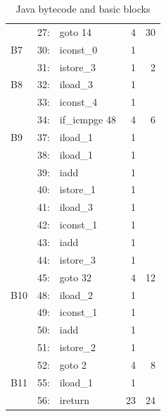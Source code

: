\begin{table}
\begin{center}
\begin{tiny}
\begin{tabular}{lllrr}
    & 27: &    goto 14           &          4         &              30 \\
    \cmidrule{1-5}
B7  & 30: &    iconst\_0         &           1        &           \\
    & 31: &    istore\_3         &           1        &                2 \\
    \cmidrule{1-5}
B8  & 32: &    iload\_3          &           1        &           \\
    & 33: &    iconst\_4         &           1        &           \\
    & 34: &    if\_icmpge 48     &           4        &                6 \\
    \cmidrule{1-5}
B9  & 37: &    iload\_1          &           1        &           \\
    & 38: &    iload\_1          &           1        &           \\
    & 39: &    iadd              &          1         &          \\
    & 40: &    istore\_1         &           1        &           \\
    & 41: &    iload\_3          &           1        &           \\
    & 42: &    iconst\_1         &           1        &           \\
    & 43: &    iadd              &          1         &          \\
    & 44: &    istore\_3         &           1        &           \\
    & 45: &    goto 32           &          4         &              12 \\
    \cmidrule{1-5}
B10 & 48: &    iload\_2          &           1        &           \\
    & 49: &    iconst\_1         &           1        &           \\
    & 50: &    iadd              &          1         &          \\
    & 51: &    istore\_2         &           1        &           \\
    & 52: &    goto 2            &          4         &               8 \\
    \cmidrule{1-5}
B11 & 55: &    iload\_1          &           1        &           \\
    & 56: &    ireturn           &         23         &              24 \\
    \bottomrule
\end{tabular}
\end{tiny}
\end{center}
    \caption{Java bytecode and basic blocks}
    \label{tab:wcet:bytecode}
\end{table}

